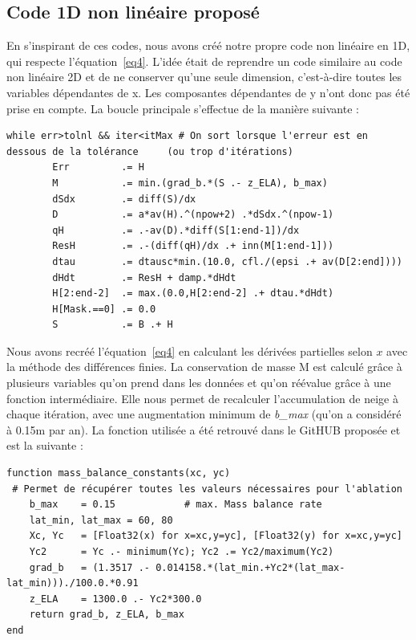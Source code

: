 \documentclass{article}
\begin{document}
\subsection{Code 1D non linéaire proposé}
En s'inspirant de ces codes, nous avons créé notre propre code non linéaire en 1D, qui respecte l'équation~\eqref{eq4}. L'idée était de reprendre un code similaire au code non linéaire 2D et de ne conserver qu'une seule dimension, c'est-à-dire toutes les variables dépendantes de x. Les composantes dépendantes de y n'ont donc pas été prise en compte. La boucle principale s'effectue de la manière suivante :
\newline
\begin{verbatim}
while err>tolnl && iter<itMax # On sort lorsque l'erreur est en 
dessous de la tolérance 	(ou trop d'itérations)
        Err         .= H                                               
        M           .= min.(grad_b.*(S .- z_ELA), b_max)            
        dSdx        .= diff(S)/dx 
        D           .= a*av(H).^(npow+2) .*dSdx.^(npow-1)              
        qH          .= .-av(D).*diff(S[1:end-1])/dx                     
        ResH        .= .-(diff(qH)/dx .+ inn(M[1:end-1])) 
        dtau        .= dtausc*min.(10.0, cfl./(epsi .+ av(D[2:end])))
        dHdt        .= ResH + damp.*dHdt                                
        H[2:end-2]  .= max.(0.0,H[2:end-2] .+ dtau.*dHdt)               
        H[Mask.==0] .= 0.0
        S           .= B .+ H                                       
\end{verbatim}
Nous avons recréé l'équation~\eqref{eq4} en calculant les dérivées partielles selon ${x}$ avec la méthode des différences finies.
La conservation de masse M est calculé grâce à plusieurs variables qu'on prend dans les données et qu'on réévalue grâce à une fonction intermédiaire. Elle nous permet de recalculer l'accumulation de neige à chaque itération, avec une augmentation minimum de \textit{b\_max} (qu'on a considéré à 0.15m par an). La fonction utilisée a été retrouvé dans le GitHUB proposée et est la suivante :
\begin{verbatim}
function mass_balance_constants(xc, yc)
 # Permet de récupérer toutes les valeurs nécessaires pour l'ablation
    b_max    = 0.15            # max. Mass balance rate
    lat_min, lat_max = 60, 80
    Xc, Yc   = [Float32(x) for x=xc,y=yc], [Float32(y) for x=xc,y=yc]
    Yc2      = Yc .- minimum(Yc); Yc2 .= Yc2/maximum(Yc2)
    grad_b   = (1.3517 .- 0.014158.*(lat_min.+Yc2*(lat_max-lat_min)))./100.0.*0.91 
    z_ELA    = 1300.0 .- Yc2*300.0                              
    return grad_b, z_ELA, b_max
end                                   
\end{verbatim}
\end{document}
